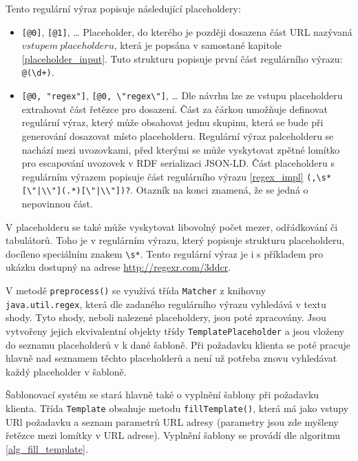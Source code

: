 \documentclass[thesis=B,czech]{FITthesis}[2012/06/26]
\begin{document}
 Tento regulární výraz popisuje následující placeholdery:
 \begin{itemize}
  \item \texttt{[@0]}, \texttt{[@1]}, \ldots
    \subitem Placeholder, do kterého je později dosazena část URL nazývaná $vstupem\ placeholderu$, která je popsána v samostané kapitole \ref{placeholder_input}.
	   Tuto strukturu popisuje první část regulárního výrazu: \texttt{@(\textbackslash d+)}.
  \item \texttt{[@0, "regex"]},  \texttt{[@0, \textbackslash "regex\textbackslash "]}, \ldots
    \subitem Dle návrhu lze ze vstupu placeholderu extrahovat část řetězce pro dosazení. Část za čárkou umožňuje definovat regulární výraz, který může obsahovat
    jednu skupinu, která se bude při generování dosazovat místo placeholderu. Regulární výraz palceholderu se nachází mezi uvozovkami, před kterými se může vyskytovat
    zpětné lomítko pro escapování uvozovek v RDF serializaci JSON-LD.
    \subitem Část placeholderu s regulárním výrazem popisuje část regulárního výrazu \ref{regex_impl}
    \texttt{(,\textbackslash s*[\textbackslash"|\textbackslash \textbackslash"](.*)[\textbackslash"|\textbackslash \textbackslash"])?}. Otazník na konci znamená,
    že se jedná o nepovinnou část.
    
 \end{itemize}
 
 V placeholderu se také může vyskytovat libovolný počet mezer, odřádkování či tabulátorů. Toho je v regulárním výrazu, který popisuje strukturu placeholderu, 
 docíleno speciálním znakem \texttt{\textbackslash s*}. Tento regulární výraz je i s příkladem pro ukázku dostupný na adrese \url{http://regexr.com/3ddcr}.
 
 V metodě \texttt{preprocess()} se využívá třída \texttt{Matcher} z knihovny\\ \texttt{java.util.regex}, která dle zadaného regulárního výrazu vyhledává
 v textu shody. Tyto shody, neboli nalezené placeholdery, jsou poté zpracovány. Jsou vytvořeny jejich ekvivalentní objekty třídy \texttt{TemplatePlaceholder}
 a jsou vloženy do seznamu placeholderů v k dané šabloně. Při požadavku klienta se poté pracuje hlavně nad seznamem těchto placeholderů a není už potřeba znovu vyhledávat
 každý placeholder v šabloně.
 
 Šablonovací systém se stará hlavně také o vyplnění šablony při požadavku klienta. Třída \texttt{Template} obsahuje metodu \texttt{fillTemplate()}, která má jako
 vstupy URl požadavku a seznam parametrů URL adresy (parametry jsou zde myšleny řetězce mezi lomítky v URL adrese).
 Vyplnění šablony se provádí dle algoritmu \ref{alg_fill_template}.
 
\end{document}
